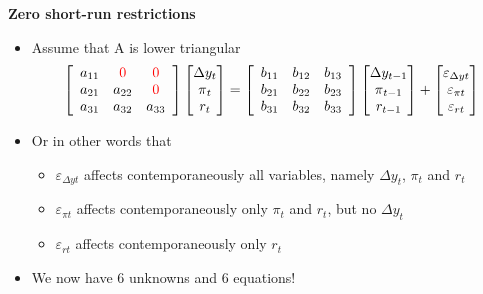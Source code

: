 \documentclass[10pt,handout]{beamer}
\begin{document}
\begin{frame}
{\textbf{Zero short-run restrictions}}

\begin{itemize}
\item Assume that A is lower triangular 
\begin{equation*}
\left[ 
\begin{array}{ccc}
a_{11} & {%
\color{red}%
{0}} & {%
\color{red}%
{0}} \\ 
a_{21} & a_{22} & {%
\color{red}%
{0}} \\ 
a_{31} & a_{32} & a_{33}%
\end{array}%
\right] 
\begin{bmatrix}
\Delta y_{t} \\ 
\pi _{t} \\ 
r_{t}%
\end{bmatrix}%
=\left[ 
\begin{array}{ccc}
b_{11} & b_{12} & b_{13} \\ 
b_{21} & b_{22} & b_{23} \\ 
b_{31} & b_{32} & b_{33}%
\end{array}%
\right] 
\begin{bmatrix}
\Delta y_{t-1} \\ 
\pi _{t-1} \\ 
r_{t-1}%
\end{bmatrix}%
+%
\begin{bmatrix}
\varepsilon _{\Delta yt} \\ 
\varepsilon _{\pi t} \\ 
\varepsilon _{rt}%
\end{bmatrix}%
\end{equation*}%
\pause

\item Or in other words that

\begin{itemize}
\item $\varepsilon _{\Delta yt}$ affects contemporaneously all variables,
namely $\Delta y_{t}$, $\pi _{t}$ and $r_{t}$

\item $\varepsilon _{\pi t}$ affects contemporaneously only $\pi _{t}$ and $%
r_{t}$, but no $\Delta y_{t}$

\item $\varepsilon _{rt}$ affects contemporaneously only $r_{t}$\smallskip 
\pause
\end{itemize}

\item We now have 6 unknowns and 6 equations!
\end{itemize}
\end{frame}
\end{document}
